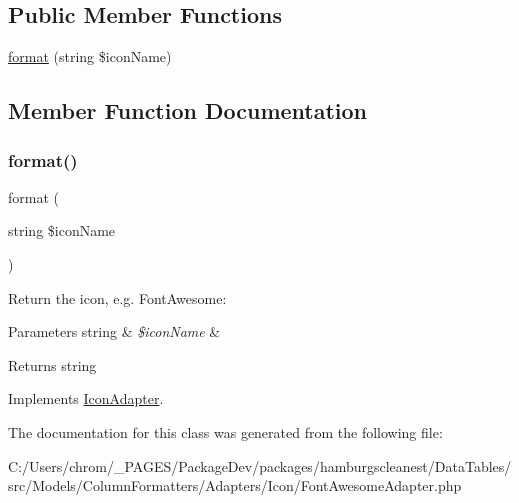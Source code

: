 \subsection*{Public Member Functions}
\begin{DoxyCompactItemize}
\item 
\hyperlink{classhamburgscleanest_1_1_data_tables_1_1_models_1_1_column_formatters_1_1_adapters_1_1_icon_1_1_font_awesome_adapter_a1d0304fbc3ae752c85fdcea52a87fa03}{format} (string \$icon\+Name)
\end{DoxyCompactItemize}


\subsection{Member Function Documentation}
\mbox{\label{classhamburgscleanest_1_1_data_tables_1_1_models_1_1_column_formatters_1_1_adapters_1_1_icon_1_1_font_awesome_adapter_a1d0304fbc3ae752c85fdcea52a87fa03}} 
\subsubsection{\texorpdfstring{format()}{format()}}
{\footnotesize\ttfamily format (\begin{DoxyParamCaption}\item[{string}]{\$icon\+Name }\end{DoxyParamCaption})}

Return the icon, e.\+g. Font\+Awesome\+: {\itshape }


\begin{DoxyParams}[1]{Parameters}
string & {\em \$icon\+Name} & \\
\hline
\end{DoxyParams}
\begin{DoxyReturn}{Returns}
string 
\end{DoxyReturn}


Implements \hyperlink{interfacehamburgscleanest_1_1_data_tables_1_1_models_1_1_column_formatters_1_1_adapters_1_1_icon_1_1_icon_adapter_a1d0304fbc3ae752c85fdcea52a87fa03}{Icon\+Adapter}.



The documentation for this class was generated from the following file\+:\begin{DoxyCompactItemize}
\item 
C\+:/\+Users/chrom/\+\_\+\+P\+A\+G\+E\+S/\+Package\+Dev/packages/hamburgscleanest/\+Data\+Tables/src/\+Models/\+Column\+Formatters/\+Adapters/\+Icon/Font\+Awesome\+Adapter.\+php\end{DoxyCompactItemize}

